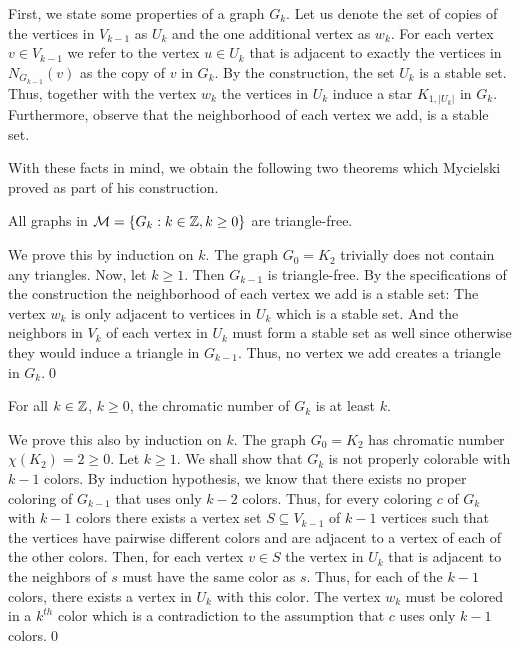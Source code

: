 First, we state some properties of a graph $G_k$. Let us denote the set of copies of the vertices in $V_{k-1}$ as $U_k$ and the one additional vertex as $w_k$. For each vertex $v\in V_{k-1}$ we refer to the vertex $u\in U_k$ that is adjacent to exactly the vertices in $N_{G_{k-1}}(v)$ as the copy of $v$ in $G_k$. By the construction, the set $U_k$ is a stable set. Thus, together with the vertex $w_k$ the vertices in $U_k$ induce a star $K_{1, \vert U_k\vert}$ in $G_k$. Furthermore, observe that the neighborhood of each vertex we add, is a stable set.

With these facts in mind, we obtain the following two theorems which Mycielski proved as part of his construction.

\begin{thm}\label{t2my}
All graphs in $\mathcal{M}=\{G_k:k\in\mathbb{Z}, k\geq 0\}$ are triangle-free.
\end{thm}
\begin{prf}
We prove this by induction on $k$. The graph $G_0=K_2$ trivially does not contain any triangles. Now, let $k\geq 1$. Then $G_{k-1}$ is triangle-free. By the specifications of the construction the neighborhood of each vertex we add is a stable set: The vertex $w_k$ is only adjacent to vertices in $U_k$ which is a stable set. And the neighbors in $V_k$ of each vertex in $U_k$ must form a stable set as well since otherwise they would induce a triangle in $G_{k-1}$. Thus, no vertex we add creates a triangle in $G_k$.\qed 
\end{prf}

\begin{thm}\label{t3my}
For all $k\in\mathbb{Z}$, $k\geq 0$, the chromatic number of $G_k$ is at least $k$.
\end{thm}
\begin{prf}
We prove this also by induction on $k$. The graph $G_0=K_2$ has chromatic number $\chi (K_2)=2 \geq 0$. Let $k\geq 1$. We shall show that $G_k$ is not properly colorable with $k-1$ colors. By induction hypothesis, we know that there exists no proper coloring of $G_{k-1}$ that uses only $k-2$ colors. Thus, for every coloring $c$ of $G_k$ with $k-1$ colors there exists a vertex set $S\subseteq V_{k-1}$ of $k-1$ vertices such that the vertices have pairwise different colors and are adjacent to a vertex of each of the other colors. Then, for each vertex $v\in S$ the vertex in $U_k$ that is adjacent to the neighbors of $s$ must have the same color as $s$. Thus, for each of the $k-1$ colors, there exists a vertex in $U_k$ with this color. The vertex $w_k$ must be colored in a $k^{th}$ color which is a contradiction to the assumption that $c$ uses only $k-1$ colors.\qed
\end{prf}

